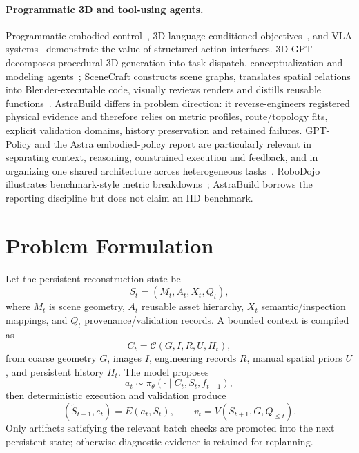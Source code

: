 \documentclass[10pt]{article}
\begin{document}
\paragraph{Programmatic 3D and tool-using agents.} Programmatic embodied control~\cite{liang2023code}, 3D language-conditioned objectives~\cite{huang2023voxposer}, and VLA systems~\cite{brohan2023rt2} demonstrate the value of structured action interfaces. 3D-GPT decomposes procedural 3D generation into task-dispatch, conceptualization and modeling agents~\cite{sun2023threegpt}; SceneCraft constructs scene graphs, translates spatial relations into Blender-executable code, visually reviews renders and distills reusable functions~\cite{hu2024scenecraft}. AstraBuild differs in problem direction: it reverse-engineers registered physical evidence and therefore relies on metric profiles, route/topology fits, explicit validation domains, history preservation and retained failures. GPT-Policy and the Astra embodied-policy report are particularly relevant in separating context, reasoning, constrained execution and feedback, and in organizing one shared architecture across heterogeneous tasks~\cite{cheng2026gptpolicy,su2026astraembodied}. RoboDojo illustrates benchmark-style metric breakdowns~\cite{chen2026robodojo}; AstraBuild borrows the reporting discipline but does not claim an IID benchmark.

\section{Problem Formulation}
Let the persistent reconstruction state be
\begin{equation}
S_t=(M_t,A_t,X_t,Q_t),
\end{equation}
where $M_t$ is scene geometry, $A_t$ reusable asset hierarchy, $X_t$ semantic/inspection mappings, and $Q_t$ provenance/validation records. A bounded context is compiled as
\begin{equation}
C_t=\mathcal{C}(G,I,R,U,H_t),
\end{equation}
from coarse geometry $G$, images $I$, engineering records $R$, manual spatial priors $U$, and persistent history $H_t$. The model proposes
\begin{equation}
a_t\sim\pi_\theta(\cdot\mid C_t,S_t,f_{t-1}),
\end{equation}
then deterministic execution and validation produce
\begin{equation}
(\widetilde S_{t+1},e_t)=E(a_t,S_t),\qquad v_t=V(\widetilde S_{t+1},G,Q_{\le t}).
\end{equation}
Only artifacts satisfying the relevant batch checks are promoted into the next persistent state; otherwise diagnostic evidence is retained for replanning.
\end{document}
